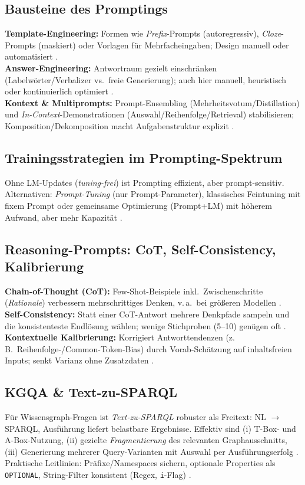 \subsection{Bausteine des Promptings}
\textbf{Template-Engineering:} Formen wie \emph{Prefix}-Prompts (autoregressiv), \emph{Cloze}-Prompts (maskiert) oder Vorlagen für Mehrfacheingaben; Design manuell oder automatisiert \cite{liu2023survey}.\\
\textbf{Answer-Engineering:} Antwortraum gezielt einschränken (Labelwörter/Verbalizer vs.\ freie Generierung); auch hier manuell, heuristisch oder kontinuierlich optimiert \cite{liu2023survey}.\\
\textbf{Kontext \& Multiprompts:} Prompt-Ensembling (Mehrheitsvotum/Distillation) und \emph{In-Context}-Demonstrationen (Auswahl/Reihenfolge/Retrieval) stabilisieren; Komposition/Dekomposition macht Aufgabenstruktur explizit \cite{liu2023survey}.

\subsection{Trainingsstrategien im Prompting-Spektrum}
Ohne LM-Updates (\emph{tuning-frei}) ist Prompting effizient, aber prompt-sensitiv. Alternativen: \emph{Prompt-Tuning} (nur Prompt-Parameter), klassisches Feintuning mit fixem Prompt oder gemeinsame Optimierung (Prompt+LM) mit höherem Aufwand, aber mehr Kapazität \cite{liu2023survey}.

\subsection{Reasoning-Prompts: CoT, Self-Consistency, Kalibrierung}
\textbf{Chain-of-Thought (CoT):} Few-Shot-Beispiele inkl.\ Zwischenschritte (\emph{Rationale}) verbessern mehrschrittiges Denken, v.\,a.\ bei größeren Modellen \cite{wei2022cot}.\\
\textbf{Self-Consistency:} Statt einer CoT-Antwort mehrere Denkpfade sampeln und die konsistenteste Endlösung wählen; wenige Stichproben (5–10) genügen oft \cite{wang2022selfconsistency}.\\
\textbf{Kontextuelle Kalibrierung:} Korrigiert Antworttendenzen (z.\,B.\ Reihenfolge-/Common-Token-Bias) durch Vorab-Schätzung auf inhaltsfreien Inputs; senkt Varianz ohne Zusatzdaten \cite{zhao2021calibrate}.

\subsection{KGQA \& Text-zu-SPARQL}
Für Wissensgraph-Fragen ist \emph{Text-zu-SPARQL} robuster als Freitext: NL $\rightarrow$ SPARQL, Ausführung liefert belastbare Ergebnisse. Effektiv sind (i) T-Box- und A-Box-Nutzung, (ii) gezielte \emph{Fragmentierung} des relevanten Graphausschnitts, (iii) Generierung mehrerer Query-Varianten mit Auswahl per Ausführungserfolg \cite{avila2024autokgqagpt}. Praktische Leitlinien: Präfixe/Namespaces sichern, optionale Properties als \texttt{OPTIONAL}, String-Filter konsistent (Regex, \texttt{i}-Flag) \cite{avila2024autokgqagpt}.

